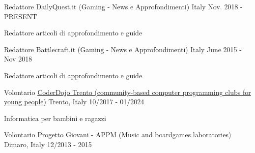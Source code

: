 

\begin{cventries}

  \cventry
    {Redattore} %
    {DailyQuest.it (Gaming - News e Approfondimenti)} %
    {Italy} %
    {Nov. 2018 - PRESENT} %
    {
      \begin{cvitems} %
        \item {Redattore articoli di approfondimento e guide}
      \end{cvitems}
    }

  \cventry
    {Redattore} %
    {Battlecraft.it (Gaming - News e Approfondimenti)} %
    {Italy} %
    {June 2015 - Nov 2018} %
    {
      \begin{cvitems} %
        \item {Redattore articoli di approfondimento e guide}
      \end{cvitems}
    }

  \cventry
    {Volontario} %
    {\href{https://www.coderdojotrento.it/}{CoderDojo Trento (community-based computer programming clubs for young people)}} %
    {Trento, Italy} %
    {10/2017 - 01/2024} %
    {
      \begin{cvitems} %
        \item {Informatica per bambini e ragazzi}
      \end{cvitems}
    }

  \cventry
    {Volontario} %
    {Progetto Giovani - APPM (Music and boardgames laboratories)} %
    {Dimaro, Italy} %
    {12/2013 - 2015} %

\end{cventries}